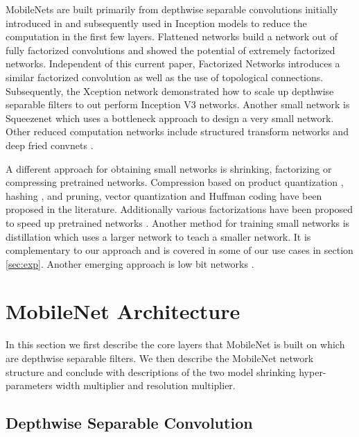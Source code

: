 \documentclass[10pt,twocolumn,letterpaper]{article}
\begin{document}
MobileNets are built primarily from depthwise separable convolutions initially introduced in \cite{sifre2014rigid} and subsequently used in Inception models \cite{ioffe2015batch} to reduce the computation in the first few layers. Flattened networks \cite{jin2014flattened} build a network out of fully factorized convolutions and showed the potential of extremely factorized networks. Independent of this current paper, Factorized Networks\cite{wang2016factorized} introduces a similar factorized convolution as well as the use of topological connections. Subsequently, the Xception network \cite{chollet2016deep} demonstrated how to scale up depthwise separable filters to out perform Inception V3 networks. Another small network is Squeezenet \cite{iandola2016squeezenet} which uses a bottleneck approach to design a very small network. Other reduced computation networks include structured transform networks \cite{sindhwani2015structured} and deep fried convnets \cite{yang2015deep}.

A different approach for obtaining small networks is shrinking, factorizing or compressing pretrained networks. Compression based on product quantization \cite{wu2015quantized}, hashing \cite{chen2015compressing}, and pruning, vector quantization and Huffman coding \cite{han2015deep} have been proposed in the literature. Additionally various factorizations have been proposed to speed up pretrained networks \cite{jaderberg2014speeding, lebedev2014speeding}. Another method for training small networks is distillation \cite{hinton2015distilling} which uses a larger network to teach a smaller network. It is complementary to our approach and is covered in some of our use cases in section \ref{sec:exp}. Another emerging approach is low bit networks \cite{courbariaux2014training, rastegari2016xnor, hubara2016quantized}.

\section{MobileNet Architecture} \label{sec:mobilenet}

In this section we first describe the core layers that MobileNet is built on which are depthwise separable filters. We then describe the MobileNet network structure and conclude with descriptions of the two model shrinking hyper-parameters width multiplier and resolution multiplier.

\subsection{Depthwise Separable Convolution}
\end{document}
